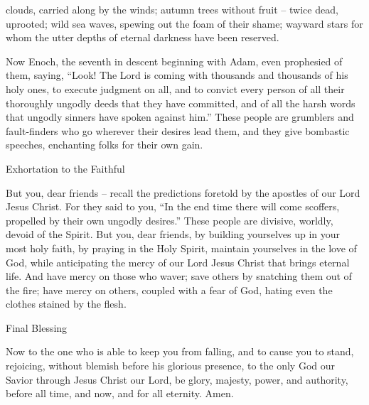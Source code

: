 {clouds,
carried along
by
the winds;
autumn
trees
without fruit –
twice
dead,
uprooted;
wild
sea
waves,
spewing out
the foam of their
shame;
wayward
stars
for whom
the utter depths
of
eternal
darkness
have been reserved.
\par }{\PP {}Now Enoch,
the seventh
in descent beginning with
Adam,
even
prophesied
of them,
saying,
“Look! The Lord
is coming
with
thousands and thousands
of his
holy ones,
to execute
judgment
on
all,
and
to convict
every person
of
all
their
thoroughly ungodly
deeds
that
they have committed,
and
of
all
the harsh words
that
ungodly
sinners
have spoken
against
him.”
These people
are
grumblers
and fault-finders
who go
wherever
their
desires
lead them, and
they give bombastic
speeches,
enchanting
folks
for their own gain.
\par }{\SH Exhortation to the Faithful
\par }{\PP {}But
you,
dear friends
– recall
the predictions
foretold
by
the apostles
of our
Lord
Jesus
Christ.
For
they said
to you,
“In
the end
time
there will come
scoffers,
propelled
by
their own
ungodly
desires.”
These people
are
divisive,
worldly,
devoid of the Spirit.
But
you,
dear friends,
by building
yourselves
up
in your
most holy
faith,
by
praying
in the Holy
Spirit,
maintain
yourselves
in
the love
of God,
while anticipating
the mercy
of our
Lord
Jesus
Christ
that brings
eternal
life.
And
have mercy
on those who
waver;
save others by snatching them out of the fire; have mercy
on others, coupled with a fear
of God, hating
even the clothes
stained
by
the flesh.
\par }{\SH Final Blessing
\par }{\PP {}Now
to the one who is able
to keep
you
from falling,
and
to cause you to stand,
rejoicing,
without blemish
before
his
glorious presence,
to the only
God
our
Savior
through
Jesus
Christ
our
Lord,
be glory,
majesty,
power,
and
authority,
before
all
time,
and
now,
and
for
all
eternity.
Amen.
\par }